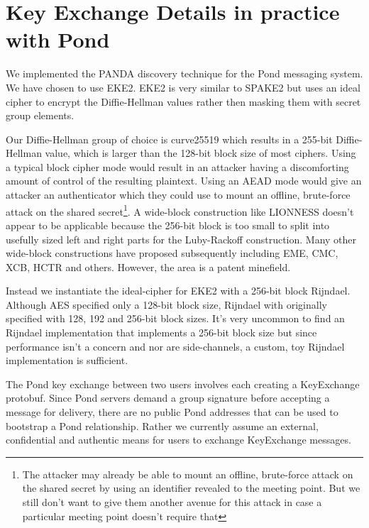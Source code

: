\documentclass[letterpaper,twocolumn,10pt]{article}
\begin{document}
\section{Key Exchange Details in practice with Pond}

We implemented the PANDA discovery technique for the Pond\cite{pond} messaging
system. We have chosen to use EKE2\cite{bellare2000authenticated}. EKE2 is very
similar to SPAKE2 but uses an ideal cipher to encrypt the Diffie-Hellman values
rather then masking them with secret group elements.

Our Diffie-Hellman group of choice is curve25519\cite{bernstein2006curve25519}
which results in a 255-bit Diffie-Hellman value, which is larger than the
128-bit block size of most ciphers. Using a typical block cipher mode would
result in an attacker having a discomforting amount of control of the resulting
plaintext. Using an AEAD mode would give an attacker an authenticator which
they could use to mount an offline, brute-force attack on the shared
secret\footnote{The attacker may already be able to mount an offline,
brute-force attack on the shared secret by using an identifier revealed to the
meeting point. But we still don't want to give them another avenue for this
attack in case a particular meeting point doesn't require that}. A wide-block
construction like LIONNESS\cite{anderson1996two} doesn't appear to be
applicable because the 256-bit block is too small to split into usefully sized
left and right parts for the Luby-Rackoff construction. Many other wide-block
constructions have proposed subsequently including
EME\cite{halevi2004parallelizable}, CMC\cite{halevi2004parallelizable},
XCB\cite{mcgrew2004extended}, HCTR\cite{wang2005hctr} and others. However, the
area is a patent minefield.

Instead we instantiate the ideal-cipher for EKE2 with a 256-bit block
Rijndael\cite{daemen2002design}. Although AES specified only a 128-bit block
size, Rijndael with originally specified with 128, 192 and 256-bit block sizes.
It's very uncommon to find an Rijndael implementation that implements a 256-bit
block size but since performance isn't a concern and nor are side-channels, a
custom, toy Rijndael implementation is sufficient.

The Pond key exchange between two users involves each creating a KeyExchange
protobuf\cite{pondprotobufs}. Since Pond servers demand a group signature
before accepting a message for delivery, there are no public Pond addresses
that can be used to bootstrap a Pond relationship. Rather we currently assume
an external, confidential and authentic means for users to exchange KeyExchange
messages.
\end{document}
